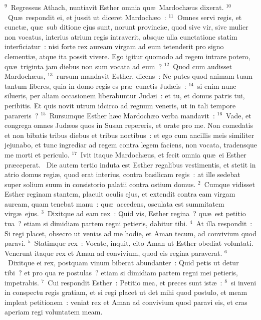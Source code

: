 ${}^{9}$~Regressus Athach, nuntiavit Esther omnia qu\ae\ Mardoch\ae us dixerat.
${}^{10}$~Qu\ae\ respondit ei, et jussit ut diceret Mardoch\ae o~:
${}^{11}$~Omnes servi regis, et cunct\ae , qu\ae\ sub ditione ejus sunt, norunt provinci\ae , quod sive vir, sive mulier non vocatus, interius atrium regis intraverit, absque ulla cunctatione statim interficiatur~: nisi forte rex auream virgam ad eum tetenderit pro signo clementi\ae , atque ita possit vivere. Ego igitur quomodo ad regem intrare potero, qu\ae\ triginta jam diebus non sum vocata ad eum~?
${}^{12}$~Quod cum audisset Mardoch\ae us,
${}^{13}$~rursum mandavit Esther, dicens~: Ne putes quod animam tuam tantum liberes, quia in domo regis es pr\ae\ cunctis Jud\ae is~:
${}^{14}$~si enim nunc silueris, per aliam occasionem liberabuntur Jud\ae i~: et tu, et domus patris tui, peribitis. Et quis novit utrum idcirco ad regnum veneris, ut in tali tempore parareris~?
${}^{15}$~Rursumque Esther h\ae c Mardoch\ae o verba mandavit~:
${}^{16}$~Vade, et congrega omnes Jud\ae os quos in Susan repereris, et orate pro me. Non comedatis et non bibatis tribus diebus et tribus noctibus~: et ego cum ancillis meis similiter jejunabo, et tunc ingrediar ad regem contra legem faciens, non vocata, tradensque me morti et periculo.
${}^{17}$~Ivit itaque Mardoch\ae us, et fecit omnia qu\ae\ ei Esther pr\ae ceperat.
~\lettrine[lines=10,image=true,loversize=0.05,lraise=-0.03]{D}{}ie autem tertio induta est Esther regalibus vestimentis, et stetit in atrio domus regi\ae , quod erat interius, contra basilicam regis~: at ille sedebat super solium suum in consistorio palatii contra ostium domus.
${}^{2}$~Cumque vidisset Esther reginam stantem, placuit oculis ejus, et extendit contra eam virgam auream, quam tenebat manu~: qu\ae\ accedens, osculata est summitatem virg\ae\ ejus.
${}^{3}$~Dixitque ad eam rex~: Quid vis, Esther regina~? qu\ae\ est petitio tua~? etiam si dimidiam partem regni petieris, dabitur tibi.
${}^{4}$~At illa respondit~: Si regi placet, obsecro ut venias ad me hodie, et Aman tecum, ad convivium quod paravi.
${}^{5}$~Statimque rex~: Vocate, inquit, cito Aman ut Esther obediat voluntati. Venerunt itaque rex et Aman ad convivium, quod eis regina paraverat.
${}^{6}$~Dixitque ei rex, postquam vinum biberat abundanter~: Quid petis ut detur tibi~? et pro qua re postulas~? etiam si dimidiam partem regni mei petieris, impetrabis.
${}^{7}$~Cui respondit Esther~: Petitio mea, et preces sunt ist\ae~:
${}^{8}$~si inveni in conspectu regis gratiam, et si regi placet ut det mihi quod postulo, et meam impleat petitionem~: veniat rex et Aman ad convivium quod paravi eis, et cras aperiam regi voluntatem meam.


